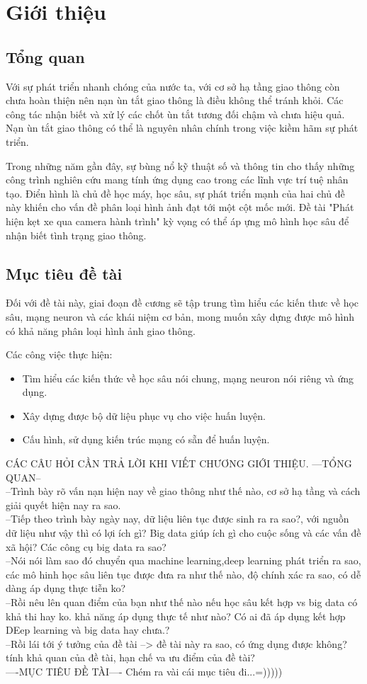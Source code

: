 \chapter{Giới thiệu}

\section{Tổng quan}
	Với sự phát triển nhanh chóng của nước ta, với cơ sở hạ tầng giao thông còn chưa hoàn thiện nên nạn ùn tắt giao thông là điều không thể tránh khỏi. Các công tác nhận biết và xử lý các chốt ùn tắt tương đối chậm và chưa hiệu quả. Nạn ùn tắt giao thông có thể là nguyên nhân chính trong việc kiềm hãm sự phát triển.\par
	Trong những năm gần đây, sự bùng nổ kỹ thuật số và thông tin cho thấy những công trình nghiên cứu mang tính ứng dụng cao trong các lĩnh vực trí tuệ nhân tạo. Điển hình là chủ đề học máy, học sâu, sự phát triển mạnh của hai chủ đề này khiến cho vấn đề phân loại hình ảnh đạt tới một cột mốc mới. Đề tài "Phát hiện kẹt xe qua camera hành trình" kỳ vọng có thể áp ựng mô hình học sâu để nhận biết tình trạng giao thông.
\section{Mục tiêu đề tài}
Đối với đề tài này, giai đoạn đề cương sẽ tập trung tìm hiểu các kiến thưc về học sâu, mạng neuron và các khái niệm cơ bản, mong muốn xây dựng được mô hình có khả năng phân loại hình ảnh giao thông.\par
Các công việc thực hiện:
\begin{itemize}
	\item Tìm hiểu các kiến thức về học sâu nói chung, mạng neuron nói riêng và ứng dụng.
	\item Xây dựng được bộ dữ liệu phục vụ cho việc huấn luyện.
	\item Cấu hình, sử dụng kiến trúc mạng có sẵn để huấn luyện.	
\end{itemize}

CÁC CÂU HỎI CẦN TRẢ LỜI KHI VIẾT CHƯƠNG GIỚI THIỆU.
---TỔNG QUAN--\\
--Trình bày rõ vấn nạn hiện nay về giao thông như thế nào, cơ sở hạ tầng và cách giải quyết hiện nay ra sao.\\
--Tiếp theo trình bày ngày nay, dữ liệu liên tục được sinh ra ra sao?, với nguồn dữ liệu như vậy thì có lợi ích gì? Big data giúp ích gì cho cuộc sống và các vấn đề xã hội? Các công cụ big data ra sao?\\
--Nói nói làm sao đó chuyển qua machine learning,deep learning phát triển ra sao, các mô hinh học sâu liên tục được đưa ra như thế nào, độ chính xác ra sao, có dễ dàng áp dụng thực tiễn ko?\\
--Rồi nêu lên quan điểm của bạn như thế nào nếu học sâu kết hợp vs big data có khả thi hay ko. khả năng áp dụng thực tế như nào? Có ai đã áp dụng kết hợp DEep learning và big data hay chưa.?\\
--Rồi lái tới ý tưởng của đề tài --> đề tài này ra sao, có ứng dụng được không? tính khả quan của đề tài, hạn chế va ưu điểm của đề tài?\\
----MỤC TIÊU ĐỀ TÀI----
Chém ra vài cái mục tiêu đi...=)))))


